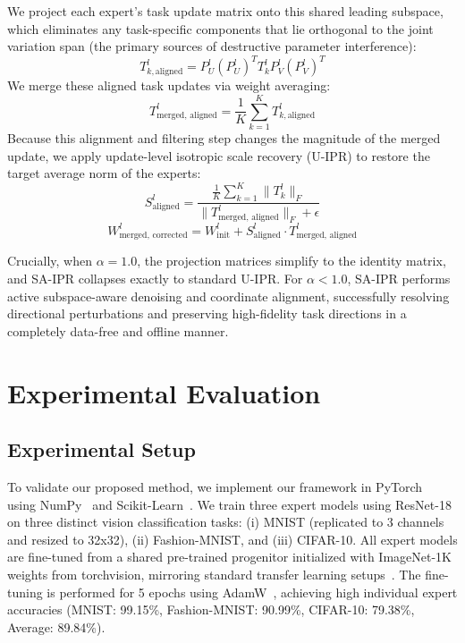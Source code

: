 \documentclass{article}
\begin{document}
We project each expert's task update matrix onto this shared leading subspace, which eliminates any
task-specific components that lie orthogonal to the joint variation span (the primary sources of
destructive parameter interference):
\begin{equation}
    T_{k, \text{aligned}}^l = P_U^l (P_U^l)^T T_k^l P_V^l (P_V^l)^T
\end{equation}
We merge these aligned task updates via weight averaging:
\begin{equation}
    T_{\text{merged, aligned}}^l = \frac{1}{K} \sum_{k=1}^K T_{k, \text{aligned}}^l
\end{equation}
Because this alignment and filtering step changes the magnitude of the merged update, we apply
update-level isotropic scale recovery (U-IPR) to restore the target average norm of the experts:
\begin{equation}
    S_{\text{aligned}}^l = \frac{\frac{1}{K} \sum_{k=1}^K \|T_k^l\|_F}{\|T_{\text{merged, aligned}}^l\|_F + \epsilon}
\end{equation}
\begin{equation}
    W_{\text{merged, corrected}}^l = W_{\text{init}}^l + S_{\text{aligned}}^l \cdot T_{\text{merged, aligned}}^l
\end{equation}

Crucially, when $\alpha = 1.0$, the projection matrices simplify to the identity matrix, and SA-IPR collapses exactly to standard U-IPR. For $\alpha < 1.0$, SA-IPR performs active subspace-aware denoising and coordinate alignment, successfully resolving directional perturbations and preserving high-fidelity task directions in a completely data-free and offline manner.

\section{Experimental Evaluation}
\label{sec:experiments}

\subsection{Experimental Setup}
To validate our proposed method, we implement our framework in PyTorch~\cite{paszke2019pytorch} using
NumPy~\cite{harris2020array} and Scikit-Learn~\cite{pedregosa2011scikit}. We train three expert
models using ResNet-18~\cite{he2016deep} on three distinct vision classification tasks: (i) MNIST
(replicated to 3 channels and resized to 32x32), (ii) Fashion-MNIST, and (iii) CIFAR-10. All
expert models are fine-tuned from a shared pre-trained progenitor initialized with
ImageNet-1K~\cite{deng2009imagenet, krizhevsky2012imagenet} weights from torchvision, mirroring
standard transfer learning setups~\cite{neyshabur2020what, radford2021learning}. The fine-tuning is
performed for 5 epochs using AdamW~\cite{loshchilov2017decoupled}, achieving high individual
expert accuracies (MNIST: 99.15\%, Fashion-MNIST: 90.99\%, CIFAR-10: 79.38\%, Average: 89.84\%).
\end{document}
